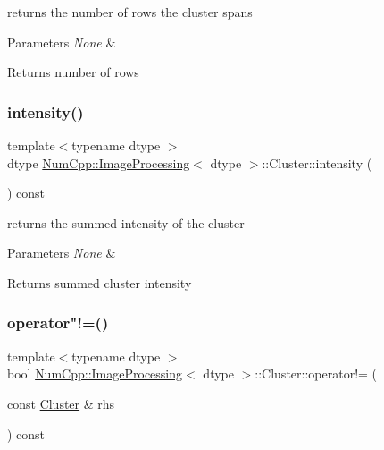 returns the number of rows the cluster spans


\begin{DoxyParams}{Parameters}
{\em None} & \\
\hline
\end{DoxyParams}
\begin{DoxyReturn}{Returns}
number of rows 
\end{DoxyReturn}
\mbox{\label{class_num_cpp_1_1_image_processing_1_1_cluster_a7d982eabfd9d738cff4cc4f77383550f}} 
\subsubsection{\texorpdfstring{intensity()}{intensity()}}
{\footnotesize\ttfamily template$<$typename dtype $>$ \\
dtype \mbox{\hyperlink{class_num_cpp_1_1_image_processing}{Num\+Cpp\+::\+Image\+Processing}}$<$ dtype $>$\+::Cluster\+::intensity (\begin{DoxyParamCaption}{ }\end{DoxyParamCaption}) const\hspace{0.3cm}{\ttfamily [inline]}}

returns the summed intensity of the cluster


\begin{DoxyParams}{Parameters}
{\em None} & \\
\hline
\end{DoxyParams}
\begin{DoxyReturn}{Returns}
summed cluster intensity 
\end{DoxyReturn}
\mbox{\label{class_num_cpp_1_1_image_processing_1_1_cluster_a5e8ef353e90cb46a52a15618d4e3da65}} 
\subsubsection{\texorpdfstring{operator"!=()}{operator!=()}}
{\footnotesize\ttfamily template$<$typename dtype $>$ \\
bool \mbox{\hyperlink{class_num_cpp_1_1_image_processing}{Num\+Cpp\+::\+Image\+Processing}}$<$ dtype $>$\+::Cluster\+::operator!= (\begin{DoxyParamCaption}\item[{const \mbox{\hyperlink{class_num_cpp_1_1_image_processing_1_1_cluster}{Cluster}} \&}]{rhs }\end{DoxyParamCaption}) const\hspace{0.3cm}{\ttfamily [inline]}}

